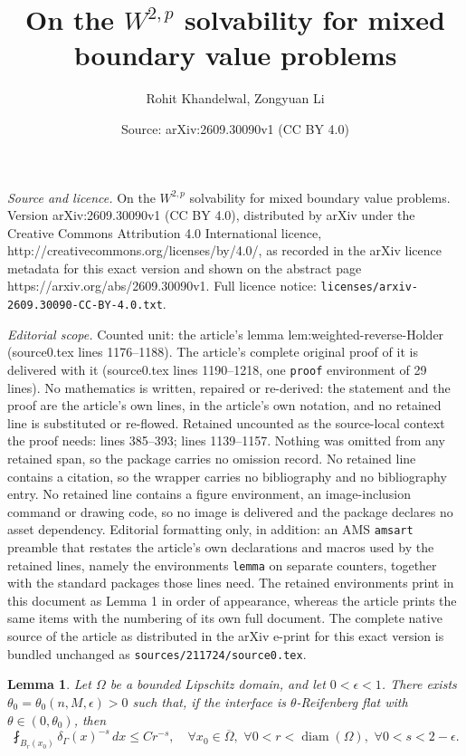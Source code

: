 \documentclass[10pt,a4paper]{amsart}
\title{On the $W^{2,p}$ solvability for mixed boundary value problems}
\author{Rohit Khandelwal, Zongyuan Li}
\date{Source: arXiv:2609.30090v1 (CC BY 4.0)}
\newtheorem{lemma}{Lemma}
\begin{document}
\maketitle

\noindent\emph{Source and licence.} On the $W^{2,p}$ solvability for mixed boundary value problems. Version arXiv:2609.30090v1 (CC BY 4.0), distributed by arXiv under the Creative Commons Attribution 4.0 International licence, http://creativecommons.org/licenses/by/4.0/, as recorded in the arXiv licence metadata for this exact version and shown on the abstract page https://arxiv.org/abs/2609.30090v1. Full licence notice: \texttt{licenses/arxiv-2609.30090-CC-BY-4.0.txt}.\par\smallskip

\noindent\textit{Editorial scope.} Counted unit: the article's lemma lem:weighted-reverse-Holder (source0.tex lines 1176--1188). The article's complete original proof of it is delivered with it (source0.tex lines 1190--1218, one \texttt{proof} environment of 29 lines). No mathematics is written, repaired or re-derived: the statement and the proof are the article's own lines, in the article's own notation, and no retained line is substituted or re-flowed.  Retained uncounted as the source-local context the proof needs: lines 385--393; lines 1139--1157.  Nothing was omitted from any retained span, so the package carries no omission record.  No retained line contains a citation, so the wrapper carries no bibliography and no bibliography entry.  No retained line contains a figure environment, an image-inclusion command or drawing code, so no image is delivered and the package declares no asset dependency.  Editorial formatting only, in addition: an AMS \texttt{amsart} preamble that restates the article's own declarations and macros used by the retained lines, namely the environments \texttt{lemma} on separate counters, together with the standard packages those lines need.  The retained environments print in this document as Lemma 1 in order of appearance, whereas the article prints the same items with the numbering of its own full document.  The complete native source of the article as distributed in the arXiv e-print for this exact version is bundled unchanged as \texttt{sources/211724/source0.tex}.
\begin{lemma} \label{lem-codim2-vol}
Let $\Omega$ be a bounded Lipschitz domain, and let $0<\epsilon<1$. There exists $\theta_0=\theta_0(n,M,\epsilon)>0$ such that, if the interface is $\theta$-Reifenberg flat with $\theta \in (0, \theta_0)$, then
\begin{equation}
  \fint_{B_r(x_0)}\delta_\Gamma(x)^{-s}\,dx\leq Cr^{-s},
  \quad
  \forall x_0 \in \overline{\Omega},\,\,\forall 0<r<\operatorname{diam}(\Omega), \,\,\forall 0<s<2-\epsilon.
  \label{eqn-260819-1032}
\end{equation}
\end{lemma}
\end{document}
